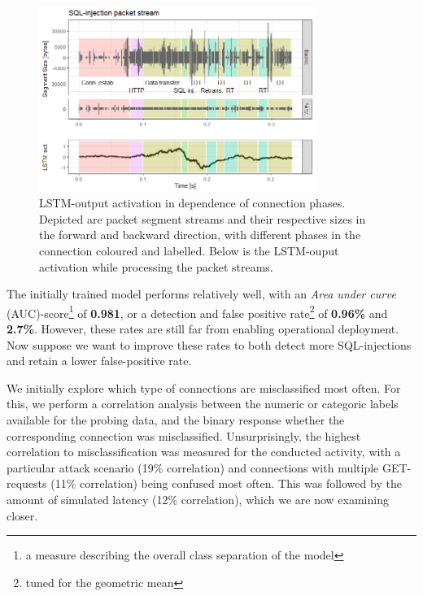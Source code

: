 \documentclass[runningheads]{llncs}
\begin{document}
\begin{figure}
\centering
\includegraphics[width=0.8\textwidth]{images/LSTM_activation.png}
\caption{LSTM-output activation in dependence of connection phases. Depicted are packet segment streams and their respective sizes in the forward and backward direction, with different phases in the connection coloured and labelled. Below is the LSTM-ouput activation while processing the packet streams.}\label{fig:LSTM_act}
\end{figure}

The initially trained model performs relatively well, with an \textit{Area under curve} (AUC)-score\footnote{a measure describing the overall class separation of the model} of \textbf{0.981}, or a detection and false positive rate\footnote{tuned for the geometric mean} of \textbf{0.96\%} and \textbf{2.7\%}. However, these rates are still far from enabling operational deployment. Now suppose we want to improve these rates to both detect more SQL-injections and retain a lower false-positive rate.

We initially explore which type of connections are misclassified most often. For this, we perform a correlation analysis between the numeric or categoric labels available for the probing data, and the binary response whether the corresponding connection was misclassified. Unsurprisingly, the highest correlation to misclassification was measured for the conducted activity, with a particular attack scenario (19\% correlation) and connections with multiple GET-requests (11\% correlation) being confused most often. This was followed by the amount of simulated latency (12\% correlation), which we are now examining closer.
\end{document}
